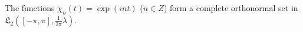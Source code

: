 The functions $\chi_n(t) = \exp(int)$ ($n \in Z$) form a complete orthonormal set in $\mathfrak{L}_2([-\pi, \pi], \frac{1}{2\pi}\lambda)$.
